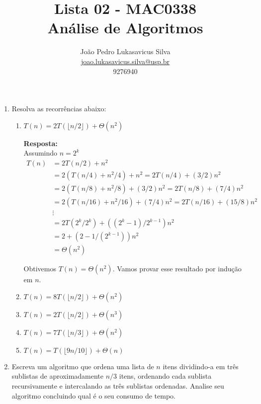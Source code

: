 \documentclass{article}
\title{
    Lista 02 - MAC0338\\
    Análise de Algoritmos
}
\author{
    João Pedro Lukasavicus Silva\\
    \href{mailto:joao.lukasavicus.silva@usp.br}
    {joao.lukasavicus.silva@usp.br}\\
    9276940
}
\begin{document}
\maketitle

\begin{enumerate}[itemsep=3ex, label=\textbf{\arabic*}.]
    \item \label{item1}
    Resolva as recorrências abaixo:

    \begin{enumerate}
        \item
        $T(n) = 2T(\lfloor n/2 \rfloor) + \Theta(n ^ 2)$

        \textbf{Resposta:}\\
        Assumindo $n = 2^k$
        \begin{align*}
            T(n) &= 2T(n/2) + n ^ 2 \\
            &= 2(T(n/4) + n ^ 2 / 4) + n ^ 2 = 2T(n/4) + (3/2)n ^ 2 \\
            &= 2(T(n/8) + n ^ 2 / 8) + (3/2)n ^ 2 = 2T(n/8) + (7/4)n ^ 2 \\
            &= 2(T(n/16) + n ^ 2 / 16) + (7/4)n ^ 2 =  2T(n/16) + (15/8)n ^ 2\\
            &\vdots\\
            &= 2T(2^k/2^k) + ((2^k - 1) / 2^{k - 1}) n^2\\
            &= 2 + (2 - 1/(2^{k - 1})) n^2 \\
            &= \Theta(n^2)
        \end{align*}

        Obtivemos $T(n) = \Theta(n^2)$. Vamos provar esse resultado por indução em $n$. \\
        

        \item
        $T(n) = 8T(\lfloor n/2 \rfloor) + \Theta(n ^ 2)$
        
        \item
        $T(n) = 2T(\lfloor n/2 \rfloor) + \Theta(n ^ 3)$
        
        \item
        $T(n) = 7T(\lfloor n/3 \rfloor) + \Theta(n ^ 2)$

        \item
        $T(n) = T(\lfloor 9n/10 \rfloor) + \Theta(n)$

    \end{enumerate}

    \item
    Escreva um algoritmo que ordena uma lista de $n$ itens dividindo-a em
    três sublistas de aproximadamente $n/3$ itens, ordenando cada sublista
    recursivamente e intercalando as três sublistas ordenadas. Analise
    seu algoritmo concluindo qual é o seu consumo de tempo.


\end{enumerate}
\end{document}
